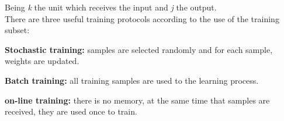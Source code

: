 Being \textit{k} the unit which receives the input and \textit{j} the output.\\

There are three useful training protocols according to the use of the training subset:
\begin{description}[itemsep=2pt,topsep=8pt,parsep=0pt,partopsep=20pt]
	\item \textbf{Stochastic training:} samples are selected randomly and for each sample, weights are updated.
	 \item \textbf{Batch training:} all training samples are used to the learning process.
	 \item \textbf{on-line training:} there is no memory, at the same time that samples are received, they are used once to train.
\end{description}

